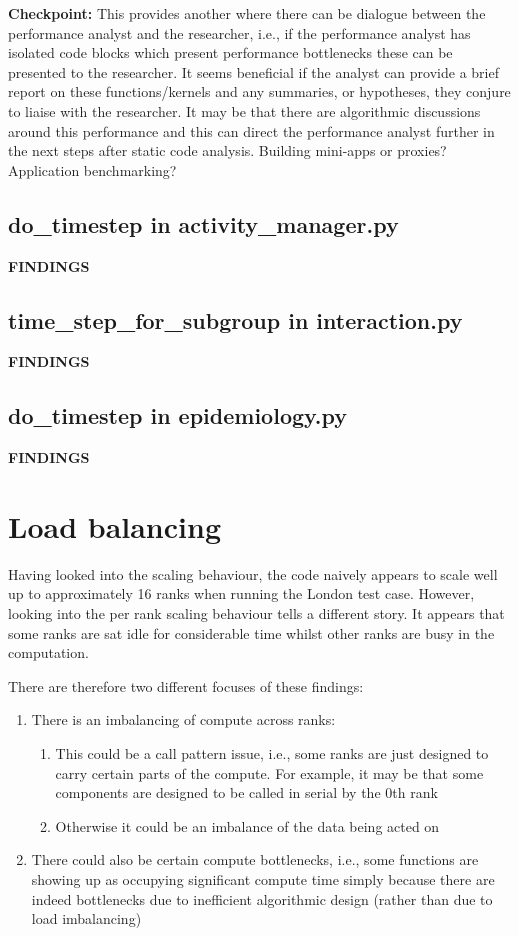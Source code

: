 \textbf{Checkpoint:} This provides another where there can be dialogue between the
performance analyst and the researcher, i.e., if the performance analyst has
isolated code blocks which present performance bottlenecks these can be
presented to the researcher. It seems beneficial if the analyst can provide a
brief report on these functions/kernels and any summaries, or hypotheses, they
conjure to liaise with the researcher. It may be that there are algorithmic
discussions around this performance and this can direct the performance analyst
further in the next steps after static code analysis. Building mini-apps or
proxies? Application benchmarking?

\subsection{do_timestep in activity_manager.py}
\textbf{FINDINGS}

\subsection{time_step_for_subgroup in interaction.py}
\textbf{FINDINGS}

\subsection{do_timestep in epidemiology.py}
\textbf{FINDINGS}

\section{Load balancing}
Having looked into the scaling behaviour, the code naively appears to scale
well up to approximately 16 ranks when running the London test case. However,
looking into the per rank scaling behaviour tells a different story. It appears
that some ranks are sat idle for considerable time whilst other ranks are busy
in the computation.

There are therefore two different focuses of these findings:
\begin{enumerate}
    \item There is an imbalancing of compute across ranks:
    \begin{enumerate}
        \item This could be a call pattern issue, i.e., some ranks are just
designed to carry certain parts of the compute. For example, it may be that
some components are designed to be called in serial by the 0th rank
        \item Otherwise it could be an imbalance of the data being acted on
    \end{enumerate}
    \item There could also be certain compute bottlenecks, i.e., some functions are
   showing up as occupying significant compute time simply because there are
indeed bottlenecks due to inefficient algorithmic design (rather than due to
load imbalancing)
\end{enumerate}


